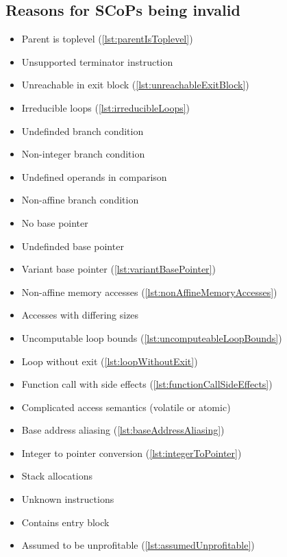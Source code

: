\subsection{Reasons for SCoPs being invalid}
\begin{itemize}
    \item Parent is toplevel (\autoref{lst:parentIsToplevel})
    \item Unsupported terminator instruction
    \item Unreachable in exit block (\autoref{lst:unreachableExitBlock})
    \item Irreducible loops (\autoref{lst:irreducibleLoops})
    \item Undefinded branch condition
    \item Non-integer branch condition
    \item Undefined operands in comparison
    \item Non-affine branch condition
    \item No base pointer
    \item Undefinded base pointer
    \item Variant base pointer (\autoref{lst:variantBasePointer})
    \item Non-affine memory accesses (\autoref{lst:nonAffineMemoryAccesses})
    \item Accesses with differing sizes
    \item Uncomputable loop bounds (\autoref{lst:uncomputeableLoopBounds})
    \item Loop without exit (\autoref{lst:loopWithoutExit})
    \item Function call with side effects (\autoref{lst:functionCallSideEffects})
    \item Complicated access semantics (volatile or atomic)
    \item Base address aliasing (\autoref{lst:baseAddressAliasing})
    \item Integer to pointer conversion (\autoref{lst:integerToPointer})
    \item Stack allocations
    \item Unknown instructions
    \item Contains entry block
    \item Assumed to be unprofitable (\autoref{lst:assumedUnprofitable})
\end{itemize}

